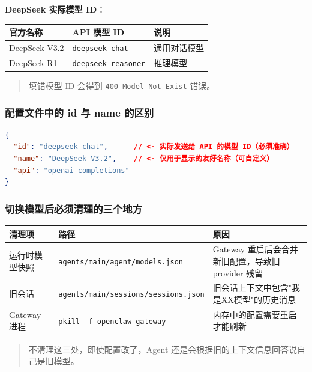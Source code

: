 \textbf{DeepSeek 实际模型 ID}：

\begin{table}[h]
\centering
\small
\begin{tabular}{|l|l|l|}
\hline
官方名称 & API 模型 ID & 说明 \\
\hline
DeepSeek-V3.2 & \texttt{deepseek-chat} & 通用对话模型 \\
\hline
DeepSeek-R1 & \texttt{deepseek-reasoner} & 推理模型 \\
\hline
\end{tabular}
\end{table}

\begin{quote}
填错模型 ID 会得到 \texttt{400 Model Not Exist} 错误。
\end{quote}

\subsubsection{配置文件中的 id 与 name 的区别}


\begin{lstlisting}[language=json]
{
  "id": "deepseek-chat",      // <- 实际发送给 API 的模型 ID（必须准确）
  "name": "DeepSeek-V3.2",    // <- 仅用于显示的友好名称（可自定义）
  "api": "openai-completions"
}
\end{lstlisting}

\subsubsection{切换模型后必须清理的三个地方}


\begin{table}[h]
\centering
\small
\begin{tabular}{|l|l|l|}
\hline
清理项 & 路径 & 原因 \\
\hline
运行时模型快照 & \texttt{agents/main/agent/models.json} & Gateway 重启后会合并新旧配置，导致旧 provider 残留 \\
\hline
旧会话 & \texttt{agents/main/sessions/sessions.json} & 旧会话上下文中包含"我是XX模型"的历史消息 \\
\hline
Gateway 进程 & \texttt{pkill -f openclaw-gateway} & 内存中的配置需要重启才能刷新 \\
\hline
\end{tabular}
\end{table}

\begin{quote}
不清理这三处，即使配置改了，Agent 还是会根据旧的上下文信息回答说自己是旧模型。
\end{quote}

